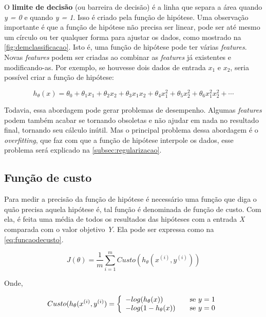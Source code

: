 O \textbf{limite de decisão} (ou barreira de decisão) é a linha que separa a área quando \textit{y = 0} e quando \textit{y = 1}. Isso é criado pela função de hipótese. Uma observação importante é que a função de hipótese não precisa ser linear, pode ser até mesmo um círculo ou ter qualquer forma para ajustar os dados, como mostrado na \autoref{fig:demclassificacao}. Isto é, uma função de hipótese pode ter várias \textit{features}. Novas \textit{features} podem ser criadas ao combinar as \textit{features} já existentes e modificando-as. Por exemplo, se houvesse dois dados de entrada $x_1$ e $x_2$, seria possível criar a função de hipótese:

\begin{equation}
\nonumber
h_{\theta}(x) = \theta_0 + \theta_1 x_1 + \theta_2 x_2 + \theta_3 x_1 x_2 + \theta_4 x_1^2 + \theta_5 x_2^2 + \theta_6 x_1^2 x_2^2 + \cdots
\end{equation}

Todavia, essa abordagem pode gerar problemas de desempenho. Algumas \textit{features} podem também acabar se tornando obsoletas e não ajudar em nada no resultado final, tornando seu cálculo inútil. Mas o principal problema dessa abordagem é o \textit{overfitting}, que faz com que a função de hipótese interpole os dados, esse problema será explicado na \autoref{subsec:regularizacao}.


\subsection{Função de custo}

Para medir a precisão da função de hipótese é necessário uma função que diga o quão precisa aquela hipótese é, tal função é denominada de função de custo. Com ela, é feita uma média de todos os resultados das hipóteses com a entrada \textit{X} comparada com o valor objetivo \textit{Y}. Ela pode ser expressa como na \autoref{eq:funcaodecusto}.

\begin{equation}
\label{eq:funcaodecusto}
J(\theta) = \frac{1}{m}\sum\limits_{i=1}^{m}Custo(h_{\theta}(x^{(i)}, y^{(i)}))
\end{equation}

Onde,


\begin{align}
 Custo(h_{\theta}(x^{(i)}, y^{(i)}) = \left\{
  \begin{array}{l l} 
    -log(h_{\theta}(x)) & \quad \text{se } y=1 \\
    -log(1 - h_{\theta}(x)) & \quad \text{se } y=0 \label{eq:funcaocusto}
  \end{array} \right.
\end{align}


